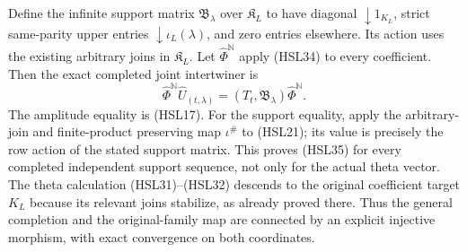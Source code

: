 Define the infinite support matrix $\mathfrak B_\lambda$
over $\mathfrak K_L$ to have diagonal $\downarrow1_{K_L}$,
strict same-parity upper entries
$\downarrow\iota_L(\lambda)$, and zero entries elsewhere.
Its action uses the existing arbitrary joins in
$\mathfrak K_L$. Let $\widehat\Phi^{\mathbb N}$ apply
(HSL34) to every coefficient. Then the exact completed
joint intertwiner is
\begin{equation}\tag{HSL35}
 \widehat\Phi^{\mathbb N}\widehat U_{(t,\lambda)}
       =(T_t,\mathfrak B_\lambda)
                         \widehat\Phi^{\mathbb N}.
\end{equation}
The amplitude equality is (HSL17). For the support equality,
apply the arbitrary-join and finite-product preserving
map $\iota^\#$ to (HSL21); its value is precisely the
row action of the stated support matrix. This proves
(HSL35) for every completed independent support sequence,
not only for the actual theta vector.
The theta calculation (HSL31)--(HSL32) descends to the
original coefficient target $K_L$ because its relevant
joins stabilize, as already proved there.
Thus the general completion and the original-family
map are connected by an explicit injective morphism,
with exact convergence on both coordinates.
